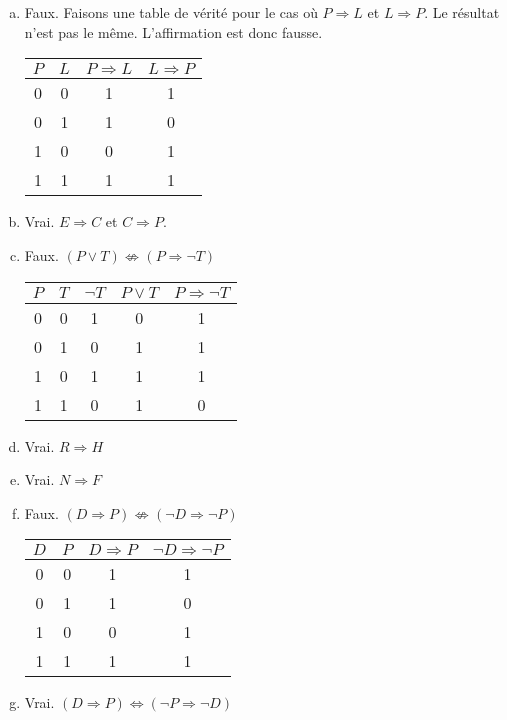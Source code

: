 \documentclass{report}
\begin{document}
\section{} %
 \begin{enumerate}[a. ]
  \item Faux. Faisons une table de v\'{e}rit\'{e} pour le cas o\`{u} $P \Rightarrow L$ et $L \Rightarrow P$. Le r\'{e}sultat n'est pas le m\^{e}me. L'affirmation est donc fausse.
	\begin{center}
	  \begin{tabular}{|cc||c||c|}
	    \hline
	  $P$ & $L$ & $P \Rightarrow L$ & $L \Rightarrow P$\\
	  \hline
	  0 & 0 & 1 & 1\\
	  0 & 1 & 1 & 0\\
	  1 & 0 & 0 & 1\\
	  1 & 1 & 1 & 1\\
	  \hline
	    \end{tabular}
	\end{center}

	
   \item Vrai. $E \Rightarrow C$ et $C \Rightarrow P$.
   
   \item Faux. $(P \vee T) \nLeftrightarrow (P \Rightarrow \neg T)$
   
      \begin{center}
	  \begin{tabular}{|cc||ccc|}
	  \hline
	  $P$ & $T$ & $\neg T$ & $P \vee T$ & $P \Rightarrow \neg T$\\
	  \hline
	  0 & 0 & 1 & 0 & 1\\
	  0 & 1 & 0 & 1 & 1\\
	  1 & 0 & 1 & 1 & 1\\
	  1 & 1 & 0 & 1 & 0\\
	  \hline
	    \end{tabular}
      \end{center}
      
  \item Vrai. $R \Rightarrow H$
  
  \item Vrai. $N \Rightarrow F$
  
  \item Faux. $(D \Rightarrow P) \nLeftrightarrow (\neg D \Rightarrow \neg P)$
	    \begin{center}
	  \begin{tabular}{|cc||c||c|}
	  \hline
	  $D$ & $P$ & $D \Rightarrow P$ & $\neg D \Rightarrow \neg P$\\
	  \hline
	  0 & 0 & 1 & 1\\
	  0 & 1 & 1 & 0\\
	  1 & 0 & 0 & 1\\
	  1 & 1 & 1 & 1\\
	  \hline
	    \end{tabular}
	    \end{center}
	    
  \item Vrai. $(D \Rightarrow P) \Leftrightarrow (\neg P \Rightarrow \neg D)$


   
 \end{enumerate}
\end{document}

